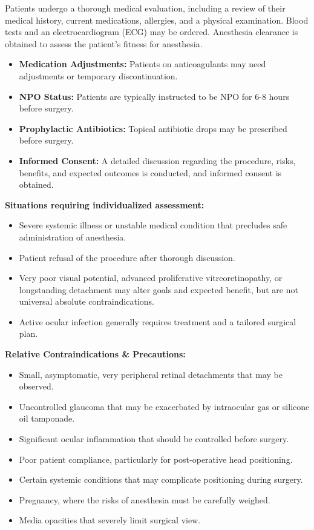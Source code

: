 Patients undergo a thorough medical evaluation, including a review of their medical history, current medications, allergies, and a physical examination. Blood tests and an electrocardiogram (ECG) may be ordered. Anesthesia clearance is obtained to assess the patient's fitness for anesthesia.

\begin{itemize}
  \item \textbf{Medication Adjustments:} Patients on anticoagulants may need adjustments or temporary discontinuation.
  \item \textbf{NPO Status:} Patients are typically instructed to be NPO for 6-8 hours before surgery.
  \item \textbf{Prophylactic Antibiotics:} Topical antibiotic drops may be prescribed before surgery.
  \item \textbf{Informed Consent:} A detailed discussion regarding the procedure, risks, benefits, and expected outcomes is conducted, and informed consent is obtained.
\end{itemize}

\textbf{Situations requiring individualized assessment:}
\begin{itemize}
  \item Severe systemic illness or unstable medical condition that precludes safe administration of anesthesia.
  \item Patient refusal of the procedure after thorough discussion.
  \item Very poor visual potential, advanced proliferative vitreoretinopathy, or longstanding detachment may alter goals and expected benefit, but are not universal absolute contraindications.
  \item Active ocular infection generally requires treatment and a tailored surgical plan.
\end{itemize}

\textbf{Relative Contraindications \& Precautions:}
\begin{itemize}
  \item Small, asymptomatic, very peripheral retinal detachments that may be observed.
  \item Uncontrolled glaucoma that may be exacerbated by intraocular gas or silicone oil tamponade.
  \item Significant ocular inflammation that should be controlled before surgery.
  \item Poor patient compliance, particularly for post-operative head positioning.
  \item Certain systemic conditions that may complicate positioning during surgery.
  \item Pregnancy, where the risks of anesthesia must be carefully weighed.
  \item Media opacities that severely limit surgical view.
\end{itemize}

